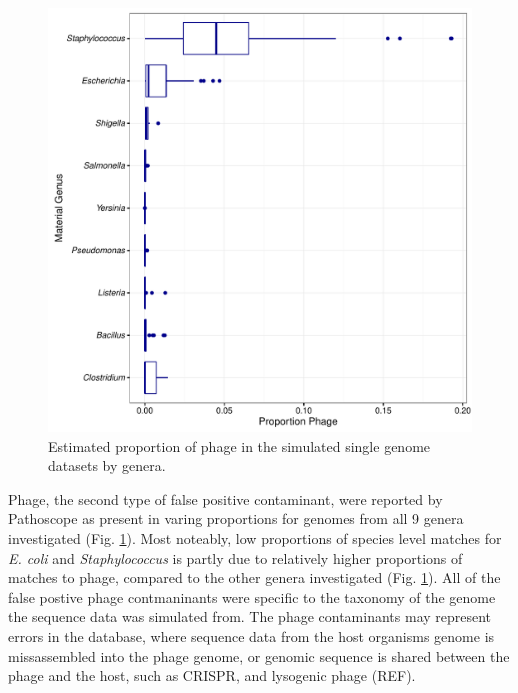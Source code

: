 \documentclass[fleqn,10pt,lineno]{wlpeerj}\usepackage[]{graphicx}\usepackage[]{color}
\makeatletter
\def\maxwidth{ %
  \ifdim\Gin@nat@width>\linewidth
    \linewidth
  \else
    \Gin@nat@width
  \fi
}
\newenvironment{knitrout}{}{} %
\makeatother
\begin{document}
\begin{knitrout}
\color{fgcolor}\begin{figure}
\includegraphics[width=\maxwidth]{figure/phage_prop-1} \caption[Estimated proportion of phage in the simulated single genome datasets by genera]{Estimated proportion of phage in the simulated single genome datasets by genera.}\label{fig:phage_prop}
\end{figure}


\end{knitrout}

Phage, the second type of false positive contaminant, were reported by Pathoscope as present in varing proportions for genomes from all 9 genera investigated (Fig. \ref{fig:phage_prop}). 
Most noteably, low proportions of species level matches for \textit{E. coli} and \textit{Staphylococcus} is partly due to relatively higher proportions of matches to phage, compared to the other genera investigated (Fig. \ref{fig:phage_prop}). 
All of the false postive phage contmaninants were specific to the taxonomy of the genome the sequence data was simulated from. 
The phage contaminants may represent errors in the database, where sequence data from the host organisms genome is missassembled into the phage genome, or genomic sequence is shared between the phage and the host, such as CRISPR, and lysogenic phage (REF).  
\end{document}
